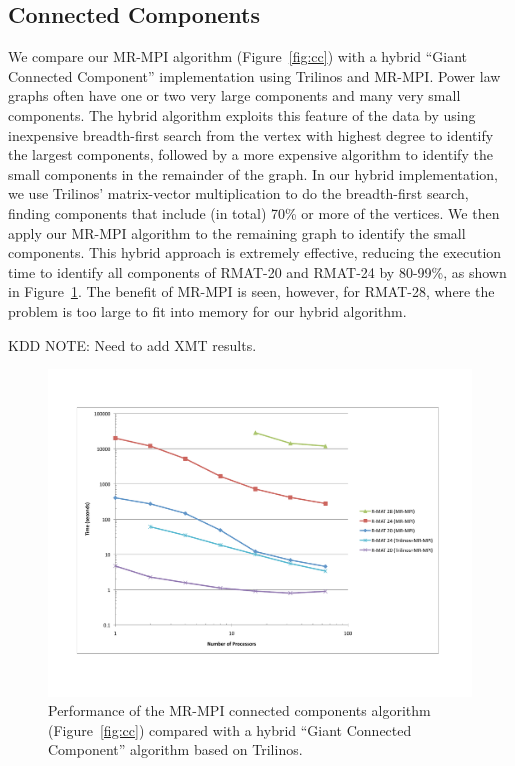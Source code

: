 \subsection{Connected Components}

We compare our MR-MPI algorithm (Figure~\ref{fig:cc}) 
with a hybrid ``Giant Connected Component''
implementation using Trilinos and MR-MPI.  Power law graphs often have one
or two very large components and many very small components.  
The hybrid algorithm exploits this feature of the data by using inexpensive
breadth-first
search from the vertex with highest degree to identify the largest components,
followed by a more expensive algorithm to identify the small components in
the remainder of the graph.  In our hybrid implementation, we use
Trilinos' matrix-vector multiplication to do the breadth-first search, 
finding components that include (in total) 70\% or more of the vertices.
We then apply our MR-MPI algorithm to the remaining graph to identify
the small components.  This hybrid approach is extremely effective,
reducing the execution time to identify all components of RMAT-20 and 
RMAT-24 by 80-99\%, as shown in Figure~\ref{f:cc}.  The benefit of MR-MPI
is seen, however, for RMAT-28, where the problem is too large to fit into
memory for our hybrid algorithm.  

KDD NOTE:  Need to add XMT results.

\begin{figure}[htb]
\includegraphics[width=\textwidth]{fig_cc.pdf}
\caption{Performance of the MR-MPI connected components algorithm (Figure~\ref{fig:cc}) compared with a hybrid ``Giant Connected Component'' algorithm based
on Trilinos.}
\label{f:cc}
\end{figure}

